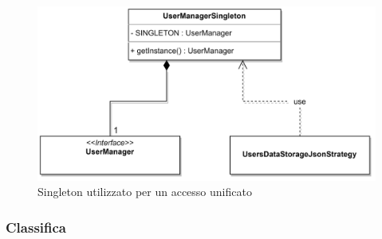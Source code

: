 \documentclass[a4paper,12pt]{report}
\begin{document}
\begin{figure}[ht]
    \begin{center}
        \centering
        \includegraphics[width=\textwidth]{img/Manuel/shadow/Singleton.png}
    \end{center}
    \caption{Singleton utilizzato per un accesso unificato}
    \label{img:Singleton}
\end{figure}
%

\subsubsection*{Classifica}
\end{document}
